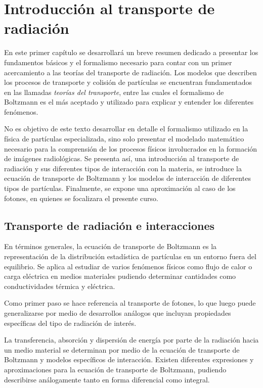 \chapter[Introducci\'on al transporte de radiaci\'on]
{Introducci\'on al transporte de radiaci\'on}



En este primer capítulo se desarrollará un breve resumen dedicado a presentar los fundamentos básicos y el formalismo necesario para contar con un primer acercamiento a las teorías del transporte de radiación. Los modelos que describen los procesos de transporte y colisión de partículas se encuentran fundamentados en las llamadas \emph{teorías del transporte}, entre las cuales el formalismo de Boltzmann es el más aceptado y utilizado para explicar y entender los diferentes fenómenos.

\noindent
No es objetivo de este texto desarrollar en detalle el formalismo utilizado en la física de partículas especializada, sino solo presentar el modelado matemático necesario para la comprensión de los procesos físicos involucrados en la formación de imágenes radiológicas. Se presenta así, una introducción al transporte de radiación y sus diferentes tipos de interacción con la materia, se introduce la ecuación de transporte de Boltzmann y los modelos de interacción de diferentes tipos de partículas. Finalmente, se expone una aproximación al caso de los fotones, en quienes se focalizara el presente curso.

\section{Transporte de radiación e interacciones}

En términos generales, la ecuación de transporte de Boltzmann es la representación de la distribución estadística de partículas en un entorno fuera del equilibrio. Se aplica al estudiar de varios fenómenos físicos como flujo de calor o carga eléctrica en medios materiales pudiendo determinar cantidades como conductividades térmica y eléctrica.

Como primer paso se hace referencia al transporte de fotones, lo que luego puede generalizarse por medio de desarrollos análogos que incluyan propiedades específicas del tipo de radiación de interés.

La transferencia, absorción y dispersión de energía por parte de la radiación hacia un medio material se determinan por medio de la ecuación de transporte de Boltzmann y modelos específicos de interacción. Existen diferentes expresiones y aproximaciones para la ecuación de transporte de Boltzmann, pudiendo describirse análogamente tanto en forma diferencial como integral.

